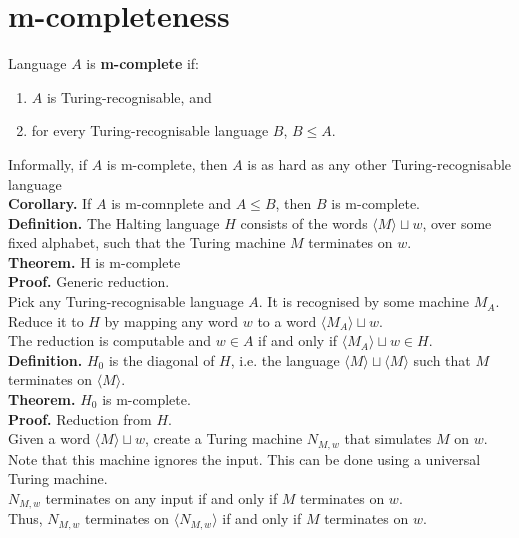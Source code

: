 \documentclass{article}
\begin{document}
\section{m-completeness}
Language $A$ is \textbf{m-complete} if:
\begin{enumerate}
	\item $A$ is Turing-recognisable, and
	\item for every Turing-recognisable language $B$, $B \leq A$.
\end{enumerate}
Informally, if $A$ is m-complete, then $A$ is as hard as any other Turing-recognisable language\medskip
\\\textbf{Corollary.} If $A$ is m-comnplete and $A \leq B$, then $B$ is m-complete.\medskip
\\\textbf{Definition.} The Halting language $H$ consists of the words $\langle M\rangle \sqcup w$, over some fixed alphabet, such that the Turing machine $M$ terminates on $w$.\medskip
\\\textbf{Theorem.} H is m-complete
\\\textbf{Proof.} Generic reduction.
\\ Pick any Turing-recognisable language $A$. It is recognised by some machine $M_A$.
\\ Reduce it to $H$ by mapping any word $w$ to a word $\langle M_A\rangle \sqcup w$.
\\ The reduction is computable and $w \in A$ if and only if $\langle M_A\rangle \sqcup w \in H$.\medskip
\\\textbf{Definition.} $H_0$ is the diagonal of $H$, i.e. the language $\langle M\rangle \sqcup \langle M\rangle$ such that $M$ terminates on $\langle M\rangle$.\medskip
\\\textbf{Theorem.} $H_0$ is m-complete.
\\\textbf{Proof.} Reduction from $H$.
\\ Given a word $\langle M\rangle \sqcup w$, create a Turing machine $N_{M, w}$ that simulates $M$ on $w$. Note that this machine ignores the input. This can be done using a universal Turing machine.
\\ $N_{M, w}$ terminates on any input if and only if $M$ terminates on $w$.
\\ Thus, $N_{M, w}$ terminates on $\langle N_{M, w}\rangle$ if and only if $M$ terminates on $w$.
\end{document}
